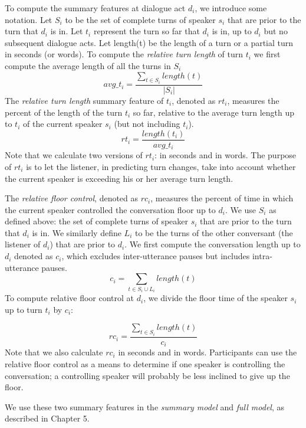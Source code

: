      To compute the summary features at dialogue act $d_i$, we introduce some notation. Let $S_i$ to be the set of complete turns of speaker $s_i$ that are prior to the turn that $d_i$ is in.  Let $t_i$ represent the turn so far that $d_i$ is in, up to $d_i$ but no subsequent dialogue acts.  Let length(t) be the length of a turn or a partial turn in seconds (or words). To compute the \textit{relative turn length} of turn $t_i$ we first compute the average length of all the turns in $S_i$
%
    \begin{equation}
     avg\_t_i = \frac{\sum_{t \in S_i} length(t)}{|S_i|}
     \end{equation}
     The \textit{relative turn length} summary feature of $t_i$, denoted as $rt_i$, measures the percent of the length of the turn $t_i$ so far, relative to the average turn length up to $t_i$ of the current speaker $s_i$ (but not including $t_i$).
%
     \begin{equation}
            rt_i =  \frac{length(t_i)} {avg\_t_i}
     \end{equation}
     Note that we calculate two versions of $rt_i$: in seconds and in words.  The purpose of $rt_i$ is to let the listener, in predicting turn changes, take into account whether the current speaker is exceeding his or her average turn length.

     The \textit{relative floor control}, denoted as $rc_i$, measures the percent of time in which the current speaker controlled the conversation floor up to $d_i$. We use $S_i$ as defined above:
     the set of complete turns of speaker $s_i$ that are prior to the turn that $d_i$ is in.
     We similarly define $L_i$ to be the turns of the other conversant (the listener of $d_i$) that are prior to $d_i$.
     We first compute the conversation length up to $d_i$ denoted as $c_i$, which excludes inter-utterance pauses but includes intra-utterance pauses.
     \begin{equation}
         c_i = \sum_{t \in S_i \cup L_i} length(t)
     \end{equation}
     To compute relative floor control at $d_i$, we divide the floor time of the speaker $s_i$ up to turn $t_i$ by $c_i$:

     \begin{equation}
        rc_i = \frac{\sum_{t \in S_i} length(t)} {c_i}
     \end{equation}
     Note that we also calculate $rc_i$ in seconds and in words. Participants can use the relative floor control as a means to determine if one speaker is controlling the conversation; a controlling speaker will probably be less inclined to give up the floor.

     We use these two summary features in the \textit{summary model} and \textit{full model}, as described in Chapter 5.


